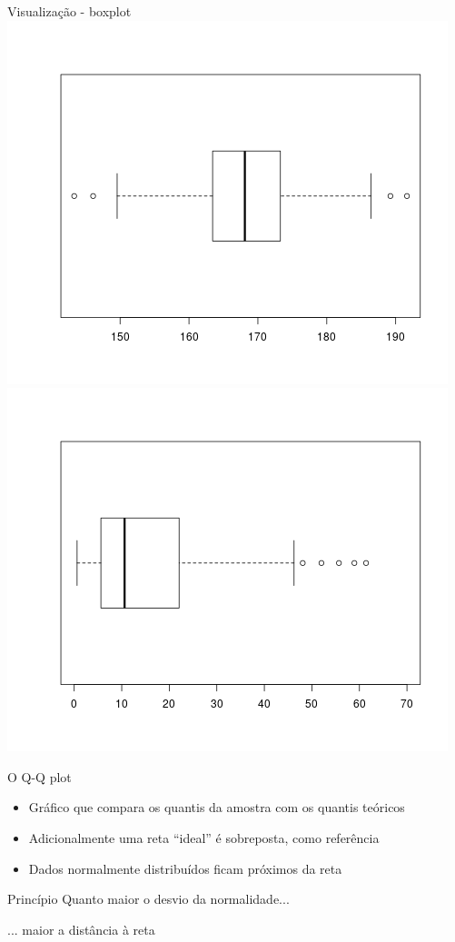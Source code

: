 \documentclass{beamer}
\begin{document}
\begin{frame}{Visualização - boxplot}
  \includegraphics[height=.5\textheight]{Cap37-38/normal-bp}
  \includegraphics[height=.5\textheight]{Cap37-38/lognormal-bp}
\end{frame}

\begin{frame}{O Q-Q plot}
  \begin{itemize}
    \small
  \item Gráfico que compara os quantis da amostra com os quantis teóricos
  \item Adicionalmente uma reta ``ideal'' é sobreposta, como referência
    \bigskip
  \item Dados normalmente distribuídos ficam próximos da reta
  \end{itemize}
  \bigskip
  \begin{block}{Princípio}
    Quanto maior o desvio da normalidade...

    \bigskip
    ... maior a distância à reta
  \end{block}
\end{frame}
\end{document}
